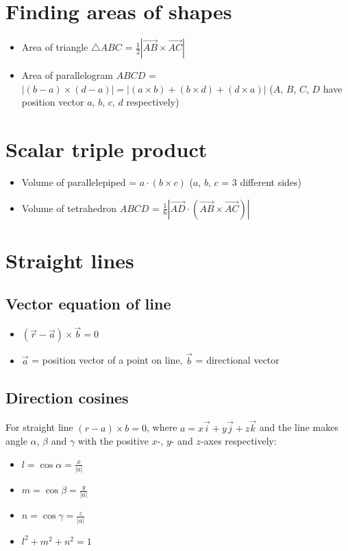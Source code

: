 \section{Finding areas of shapes}
\begin{itemize}
    \item Area of triangle $\bigtriangleup ABC$ = $\frac{1}{2}|\overrightarrow{AB}\times\overrightarrow{AC}|$
    \item Area of parallelogram $ABCD$ = $|(b-a) \times (d-a)|=|(a\times b)+(b \times d) + (d \times a)|$ ($A$, $B$, $C$, $D$ have position vector $a$, $b$, $c$, $d$ respectively)
\end{itemize}
\section{Scalar triple product}
\begin{itemize}
    \item Volume of parallelepiped = $a\cdot(b\times c)$ ($a$, $b$, $c$ = 3 different sides)
    \item Volume of tetrahedron $ABCD$ = $\frac{1}{6}|\overrightarrow{AD}\cdot(\overrightarrow{AB}\times\overrightarrow{AC})|$
\end{itemize}
\section{Straight lines}
\subsection{Vector equation of line}
\begin{itemize}
    \item $(\vec{r}-\vec{a})\times\vec{b}=0$
    \item $\vec{a}$ = position vector of a point on line, $\vec{b}$ = directional vector
\end{itemize}
\subsection{Direction cosines}
For straight line $(r-a)\times b=0$, where $a=x\vec{i}+y\vec{j}+z\vec{k}$ and the line makes angle $\alpha$, $\beta$ and $\gamma$ with the positive $x$-, $y$- and $z$-axes respectively:
\begin{itemize}
    \item $l=\cos\alpha = \frac{x}{|a|}$
    \item $m=\cos\beta = \frac{y}{|a|}$
    \item $n=\cos\gamma = \frac{z}{|a|}$
    \item $l^2+m^2+n^2=1$
\end{itemize}